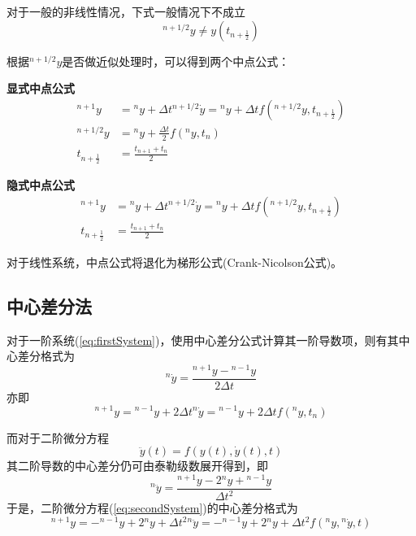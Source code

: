 对于一般的非线性情况，下式一般情况下不成立
\begin{equation}
{^{n+1/2}\!y}\neq y(t_{n+\frac{1}{2}})
\end{equation}

根据${^{n+1/2}\!y}$是否做近似处理时，可以得到两个中点公式：

\textbf{显式中点公式\cite{Gear1971a}}
\begin{align}
{^{n+1}\!y}&={^n\!y}+\Delta t{^{n+1/2}\!\dot{y}}={^n\!y}+\Delta tf({^{n+1/2}\!{y}},t_{n+\frac{1}{2}})\\
{^{n+1/2}\!{y}}&={^n\!y}+\frac{\Delta t}{2}f({^n\!y},t_n)\\
t_{n+\frac12}&=\frac{t_{n+1}+t_n}{2}
\end{align}

\textbf{隐式中点公式\cite{Hairer1993}}
\begin{align}
{^{n+1}\!y}&={^n\!y}+\Delta t{^{n+1/2}\!\dot{y}}={^n\!y}+\Delta tf({^{n+1/2}\!{y}},t_{n+\frac{1}{2}})\\
t_{n+\frac12}&=\frac{t_{n+1}+t_n}{2}
\end{align}

对于线性系统，中点公式将退化为梯形公式(Crank-Nicolson公式)。

\subsection{中心差分法}
对于一阶系统(\ref{eq:firstSystem})，使用中心差分公式计算其一阶导数项，则有其中心差分格式为
\begin{equation}
{^n\!\dot{y}}=\frac{{^{n+1}\!y}-{^{n-1}\!y}}{2\Delta t}
\end{equation}
亦即
\begin{equation}
{^{n+1}\!y}={^{n-1}\!y}+2\Delta t{^n\!\dot{y}}={^{n-1}\!y}+2\Delta tf({^n\!y},t_n)
\end{equation}

而对于二阶微分方程
\begin{equation}
\ddot{y}(t)=f(y(t),\dot{y}(t),t)\label{eq:secondSystem}
\end{equation}
其二阶导数的中心差分仍可由泰勒级数展开得到，即
\begin{equation}
{^n\!\ddot{y}}=\frac{{^{n+1}\!y}-2{^n\!y}+{^{n-1}\!y}}{\Delta t^2}
\end{equation}
于是，二阶微分方程(\ref{eq:secondSystem})的中心差分格式为
\begin{equation}
{^{n+1}\!y}=-{^{n-1}\!y}+2{^n\!y}+\Delta t^2{^n\!\ddot{y}}=-{^{n-1}\!y}+2{^n\!y}+\Delta t^2f({^n\!y},{^n\!\dot{y}},t)
\end{equation}

